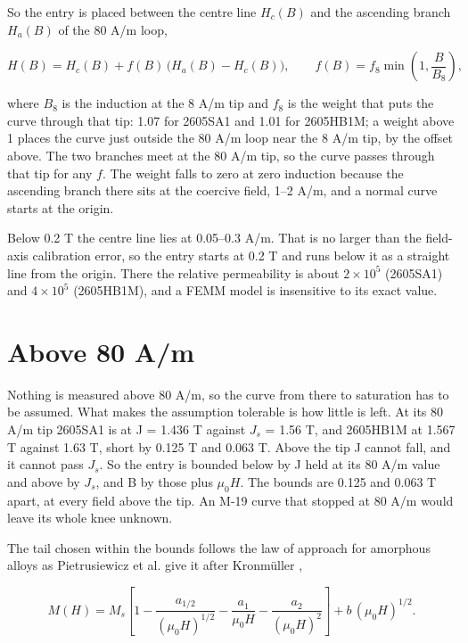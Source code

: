 \documentclass[
  11pt,
]{article}
\begin{document}
So the entry is placed between the centre line \(H_c(B)\) and the ascending branch \(H_a(B)\) of the 80 A/m loop,

\begin{equation}\label{eq:weight}
H(B) = H_c(B) + f(B)\,\bigl(H_a(B) - H_c(B)\bigr), \qquad f(B) = f_8 \min\!\left(1, \frac{B}{B_8}\right),
\end{equation}

where \(B_8\) is the induction at the 8 A/m tip and \(f_8\) is the weight that puts the curve through that tip: 1.07 for 2605SA1 and 1.01 for 2605HB1M; a weight above 1 places the curve just outside the 80 A/m loop near the 8 A/m tip, by the offset above. The two branches meet at the 80 A/m tip, so the curve passes through that tip for any \(f\). The weight falls to zero at zero induction because the ascending branch there sits at the coercive field, 1--2 A/m, and a normal curve starts at the origin.

Below 0.2 T the centre line lies at 0.05--0.3 A/m. That is no larger than the field-axis calibration error, so the entry starts at 0.2 T and runs below it as a straight line from the origin. There the relative permeability is about \(2\times10^{5}\) (2605SA1) and \(4\times10^{5}\) (2605HB1M), and a FEMM model is insensitive to its exact value.

\section{Above 80 A/m}\label{above-80-am}

Nothing is measured above 80 A/m, so the curve from there to saturation has to be assumed. What makes the assumption tolerable is how little is left. At its 80 A/m tip 2605SA1 is at J = 1.436 T against \(J_s\) = 1.56 T, and 2605HB1M at 1.567 T against 1.63 T, short by 0.125 T and 0.063 T. Above the tip J cannot fall, and it cannot pass \(J_s\). So the entry is bounded below by J held at its 80 A/m value and above by \(J_s\), and B by those plus \(\mu_0 H\). The bounds are 0.125 and 0.063 T apart, at every field above the tip. An M-19 curve that stopped at 80 A/m would leave its whole knee unknown.

The tail chosen within the bounds follows the law of approach for amorphous alloys as Pietrusiewicz et al. give it after Kronmüller \cite{pietrusiewicz2014},

\begin{equation}\label{eq:kronmuller}
M(H) = M_s\left[1 - \frac{a_{1/2}}{(\mu_0 H)^{1/2}} - \frac{a_1}{\mu_0 H} - \frac{a_2}{(\mu_0 H)^{2}}\right] + b\,(\mu_0 H)^{1/2}.
\end{equation}
\end{document}
